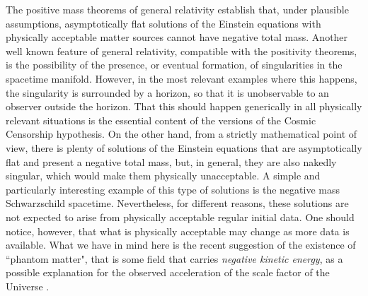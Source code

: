 \documentclass[12pt,aps,floats,showpacs,amssymb,tightenlines]{revtex4}
\begin{document}
The positive mass theorems of general relativity establish that, under plausible assumptions,
asymptotically flat solutions of the Einstein equations with physically acceptable matter sources
cannot have negative total mass. Another well known feature of general relativity, compatible with
the positivity theorems, is the possibility of the presence, or eventual formation, of singularities
 in the spacetime manifold. However, in the most relevant examples where this happens, the singularity
 is surrounded by a horizon, so that it is unobservable to an observer outside the horizon. That this
 should happen generically in all physically relevant situations is the essential content of the versions
 of the Cosmic Censorship hypothesis. On the other hand, from a strictly mathematical point of view,
 there is plenty of solutions of the Einstein equations that are asymptotically flat and present a
  negative total mass, but, in general, they are also nakedly singular, which would make them physically
   unacceptable. A simple and particularly interesting example of this type of solutions is the
   negative mass Schwarzschild spacetime. Nevertheless, for different reasons, these solutions
   are not expected to arise from physically acceptable regular initial data. One should notice,
   however, that what is physically acceptable may change as more data is available. What we
   have in mind here is the recent suggestion of the existence of ``phantom matter", that is some
   field that carries {\em negative kinetic energy}, as a possible explanation for the observed
    acceleration of the scale factor of the Universe \cite{pm}.
\end{document}
